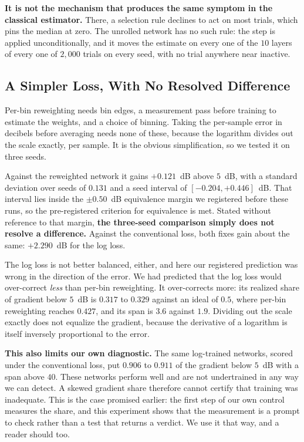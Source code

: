 \documentclass[journal]{IEEEtran}
\begin{document}
\textbf{It is not the mechanism that produces the same symptom in the classical
estimator.} There, a selection rule declines to act on most trials, which pins
the median at zero. The unrolled network has no such rule: the step is applied
unconditionally, and it moves the estimate on every one of the $10$ layers of
every one of $2{,}000$ trials on every seed, with no trial anywhere near
inactive.

\subsection{A Simpler Loss, With No Resolved Difference}
\label{sec:logloss}

Per-bin reweighting needs bin edges, a measurement pass before training to
estimate the weights, and a choice of binning. Taking the per-sample error in
decibels before averaging needs none of these, because the logarithm divides
out the scale exactly, per sample. It is the obvious simplification, so we
tested it on three seeds.

Against the reweighted network it gains $+0.121$~dB above $5$~dB, with a
standard deviation over seeds of $0.131$ and a seed interval of
$[-0.204,+0.446]$~dB. That interval lies inside the $\pm0.50$~dB equivalence
margin we registered before these runs, so the pre-registered criterion for
equivalence is met. Stated without reference to that margin, \textbf{the
three-seed comparison simply does not resolve a difference.} Against the
conventional loss, both fixes gain about the same: $+2.290$~dB for the log
loss.

The log loss is not better balanced, either, and here our registered prediction
was wrong in the direction of the error. We had predicted that the log loss
would over-correct \emph{less} than per-bin reweighting. It over-corrects more:
its realized share of gradient below $5$~dB is $0.317$ to $0.329$ against an
ideal of $0.5$, where per-bin reweighting reaches $0.427$, and its span is $3.6$
against $1.9$. Dividing out the scale exactly does not equalize the gradient,
because the derivative of a logarithm is itself inversely proportional to the
error.

\textbf{This also limits our own diagnostic.} The same log-trained networks,
scored under the conventional loss, put $0.906$ to $0.911$ of the gradient
below $5$~dB with a span above $40$. These networks perform well and are not
undertrained in any way we can detect. A skewed gradient share therefore cannot
certify that training was inadequate. This is the case promised earlier: the
first step of our own control measures the share, and this experiment shows
that the measurement is a prompt to check rather than a test that returns a
verdict. We use it that way, and a reader should too.
\end{document}
